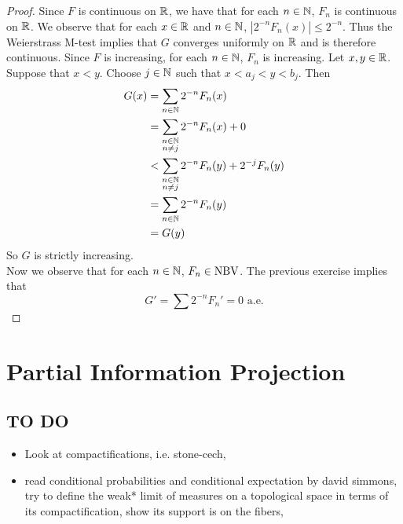 \documentclass{book}
\begin{document}
	\begin{proof}
		Since $F$ is continuous on $\mathbb{R}$, we have that for each $n \in \mathbb{N}$, $F_n$ is continuous on $\mathbb{R}$. We observe that for each $x \in \mathbb{R}$ and $n \in \mathbb{N}$, $|2^{-n}F_n(x)| \leq 2^{-n}$. Thus the Weierstrass M-test implies that $G$ converges uniformly on $\mathbb{R}$ and is therefore continuous. Since $F$ is increasing, for each $n \in \mathbb{N}$, $F_n$ is increasing. Let $x, y \in \mathbb{R}$. Suppose that $x<y$. Choose $j \in \mathbb{N}$ such that $x<a_j<y<b_j$. Then 
		\begin{align*}
			G(x) 
			&= \sum\limits_{n \in \mathbb{N}}2^{-n}F_n(x)\\
			&= \sum\limits_{\substack{n \in \mathbb{N}\\ n \neq j}}2^{-n}F_n(x) + 0\\
			& < \sum\limits_{\substack{n \in \mathbb{N}\\ n \neq j}}2^{-n}F_n(y) + 2^{-j}F_n(y)\\
			&=\sum\limits_{n \in \mathbb{N}}2^{-n}F_n(y)\\
			&=G(y)
		\end{align*}
		So $G$ is strictly increasing.\\
		Now we observe that for each $n \in \mathbb{N}$, $F_n \in \text{NBV}$. The previous exercise implies that $$G' = \sum 2^{-n}F_n'=0 \text{ a.e.}$$
	\end{proof}
	
	
	
	
	
	
	
	
	
	
	
	
	
	
	
	
	
	
	
	
	
	
	
	
	
	
	
	
	
	
	
	
	
	
	\newpage
	\section{Partial Information Projection}
	
	\subsection{TO DO}
	\begin{itemize}
		\item Look at compactifications, i.e. stone-cech, 
		\item read conditional probabilities and conditional expectation by david simmons, try to define the weak* limit of measures on a topological space in terms of its compactification, show its support is on the fibers,
	\end{itemize}
	
\end{document}
